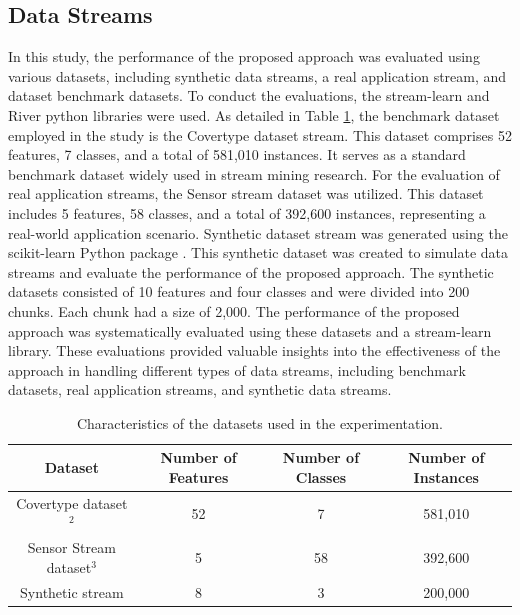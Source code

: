 \subsection{Data Streams}
In this study, the performance of the proposed approach was evaluated using various datasets, including synthetic data streams, a real application stream, and dataset benchmark datasets. To conduct the evaluations, the stream-learn and River python libraries \cite{ksieniewicz2022stream} were used. As detailed in Table \ref{tab:5_1}, the benchmark dataset employed in the study is the Covertype dataset stream. This dataset comprises 52 features, 7 classes, and a total of 581,010 instances. It serves as a standard benchmark dataset widely used in stream mining research. For the evaluation of real application streams, the Sensor stream dataset was utilized. This dataset includes 5 features, 58 classes, and a total of 392,600 instances, representing a real-world application scenario. Synthetic dataset stream was generated using the scikit-learn Python package \cite{ksieniewicz2022stream}. This synthetic dataset was created to simulate data streams and evaluate the performance of the proposed approach. The synthetic datasets consisted of 10 features and four classes and were divided into 200 chunks. Each chunk had a size of 2,000. The performance of the proposed approach was systematically evaluated using these datasets and a stream-learn library. These evaluations provided valuable insights into the effectiveness of the approach in handling different types of data streams, including benchmark datasets, real application streams, and synthetic data streams.
\begin{table}[!ht]
  \centering
  \begin{tabular}{|c|c|c|c|}
  \hline
  \textbf{Dataset} & \textbf{Number of Features} & \textbf{Number of Classes} & \textbf{Number of Instances} \\ \hline
  Covertype dataset$^2$ & 52 & 7 & 581,010  \\ \hline
  Sensor Stream dataset$^3$ & 5 & 58 & 392,600 \\ \hline
  Synthetic stream & 8 & 3 & 200,000 \\ \hline
  \end{tabular}
  \caption{Characteristics of the datasets used in the experimentation.}
  \label{tab:5_1}
  \end{table}

